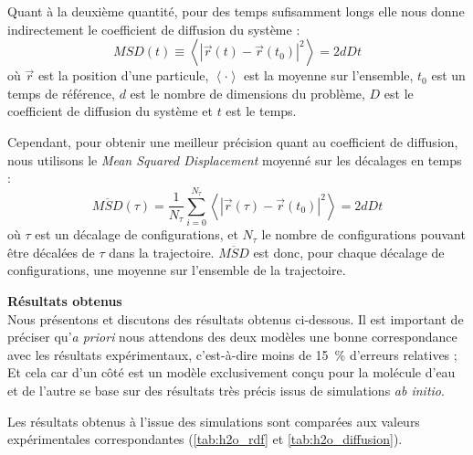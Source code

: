 Quant à la deuxième quantité, pour des temps sufisamment longs elle nous donne indirectement le coefficient de diffusion du système :
\begin{equation*}
    MSD(t) \equiv \left\langle \left| \vec{r}(t) - \vec{r}(t_0) \right|^2 \right\rangle = 2 d D t
\end{equation*}
où $\vec{r}$ est la position d'une particule, $\left\langle \cdot \right\rangle$ est la moyenne sur l'ensemble, $t_0$ est un temps de référence, $d$ est le nombre de dimensions du problème, $D$ est le coefficient de diffusion du système et $t$ est le temps.

Cependant, pour obtenir une meilleur précision quant au coefficient de diffusion, nous utilisons le \emph{Mean Squared Displacement} moyenné sur les décalages en temps :
\begin{equation}
    \boxed%
    {
        \overline{MSD} (\tau) = \frac{1}{N_{\tau}} \sum_{i = 0}^{N_{\tau}} \left\langle \left| \vec{r}(\tau) - \vec{r}(t_0) \right|^2 \right\rangle  = 2 d D t
    }
\end{equation}
où $\tau$ est un décalage de configurations, et $N_{\tau}$ le nombre de configurations pouvant être décalées de $\tau$ dans la trajectoire. $\overline{MSD}$ est donc, pour chaque décalage de configurations, une moyenne sur l'ensemble de la trajectoire.

\textbf{Résultats obtenus}\\
Nous présentons et discutons des résultats obtenus ci-dessous. Il est important de préciser qu'\textit{a priori} nous attendons des deux modèles une bonne correspondance avec les résultats expérimentaux, c'est-à-dire moins de \qty{15}{\percent} d'erreurs relatives ; Et cela car d'un côté \spce{} est un modèle exclusivement conçu pour la molécule d'eau et de l'autre \reaxff{} se base sur des résultats très précis issus de simulations \textit{ab initio}.

Les résultats obtenus à l'issue des simulations sont comparées aux valeurs expérimentales correspondantes\cite{soper_radial_2000}\cite{tsimpanogiannis_self-diffusion_2019} (\autoref{tab:h2o_rdf} et \ref{tab:h2o_diffusion}).

